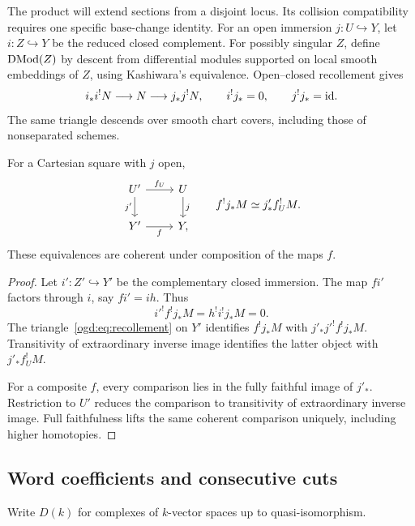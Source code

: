 The product will extend sections from a disjoint locus.
Its collision compatibility requires one specific base-change identity.
For\label{ogd:def:closed-complement-inclusion} an open immersion \(j:U\hookrightarrow Y\), let \(i:Z\hookrightarrow Y\) be the reduced closed complement.
For possibly singular \(Z\), define \(\operatorname{DMod}(Z)\) by descent from differential modules supported on local smooth embeddings of \(Z\), using Kashiwara's equivalence.
Open--closed recollement gives
\begin{equation}\label{ogd:eq:recollement}
 i_*i^!N\longrightarrow N\longrightarrow j_*j^!N,
 \qquad i^!j_*=0,\qquad j^!j_*=\mathrm{id}.
\end{equation}
The same triangle descends over smooth chart covers, including those of
nonseparated schemes.

\begin{lemma}\label{ogd:lem:basechange}
For a Cartesian square with \(j\) open,
\[
\begin{tikzcd}
 U'\arrow[r,"f_U"]\arrow[d,"j'"']&U\arrow[d,"j"]\\
 Y'\arrow[r,"f"']&Y,
\end{tikzcd}
\qquad
 f^!j_*M\simeq j'_*f_U^!M.
\]
These equivalences are coherent under composition of the maps \(f\).
\end{lemma}
\begin{proof}
Let \(i':Z'\hookrightarrow Y'\) be the complementary closed immersion.
The map \(fi'\) factors through \(i\), say \(fi'=ih\).
Thus
\[
 i'^!f^!j_*M=h^!i^!j_*M=0.
\]
The triangle~\eqref{ogd:eq:recollement} on \(Y'\) identifies \(f^!j_*M\) with
\(j'_*j'^!f^!j_*M\).
Transitivity of extraordinary inverse image identifies the latter object with \(j'_*f_U^!M\).

For a composite \(f\), every comparison lies in the fully faithful image of \(j'_*\).
Restriction to \(U'\) reduces the comparison to transitivity of extraordinary inverse image.
Full faithfulness lifts the same coherent comparison uniquely, including higher homotopies.
\end{proof}

\subsection{Word coefficients and consecutive cuts}

Write\label{ogd:def:ground-derived-category}\label{ogd:def:derived-vector-space-category} $D(k)$ for complexes of $k$-vector spaces up to quasi-isomorphism.

